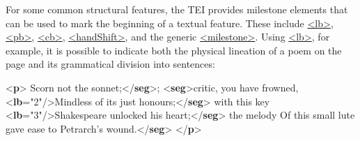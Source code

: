 For some common structural features, the TEI provides milestone elements that can be used to mark the beginning of a textual feature. These include \hyperref[TEI.lb]{<lb>}, \hyperref[TEI.pb]{<pb>}, \hyperref[TEI.cb]{<cb>}, \hyperref[TEI.handShift]{<handShift>}, and the generic \hyperref[TEI.milestone]{<milestone>}. Using \hyperref[TEI.lb]{<lb>}, for example, it is possible to indicate both the physical lineation of a poem on the page and its grammatical division into sentences: \par\bgroup{}\exampleFont \begin{shaded}\noindent\mbox{}{<\textbf{p}>}\mbox{}\newline 
{}\mbox{}\newline 
\hspace*{1em}Scorn not the sonnet;{</\textbf{seg}>}; {<\textbf{seg}>}critic, you have\mbox{}\newline 
\hspace*{1em}\hspace*{1em} frowned, {<\textbf{lb}\hspace*{1em}{n}="{2}"/>}Mindless of its just honours;{</\textbf{seg}>}\mbox{}\newline 
{}with this\mbox{}\newline 
\hspace*{1em}\hspace*{1em} key {<\textbf{lb}\hspace*{1em}{n}="{3}"/>}Shakespeare unlocked his heart;{</\textbf{seg}>}\mbox{}\newline 
{}the melody\mbox{}\newline 
{}Of this small lute gave ease to Petrarch's\mbox{}\newline 
\hspace*{1em}\hspace*{1em} wound.{</\textbf{seg}>}\mbox{}\newline 
{</\textbf{p}>}\end{shaded}\egroup\par \par

